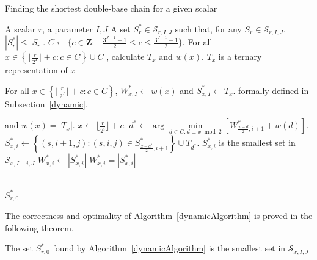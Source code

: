 \begin{algorithm}
	\caption{Finding the shortest double-base chain for a given scalar}
	\begin{algorithmic}
		\Require A scalar $r$, a parameter $I, J$
		\Ensure A set $S_r^* \in \mathcal{S}_{r,I,J}$ such that, for any $S_r \in \mathcal{S}_{r,I,J}$, $|S^*_r| \leq |S_r|$. 
		\Statex
		\State $C \leftarrow \{c \in \mathbf{Z} : -\frac{3^{J + 1} - 1}{2} \leq c \leq  \frac{3^{J + 1} - 1}{2}\}$.
		\State For all $x \in \left\{ \lfloor \frac{r}{2^I} \rfloor + c  : c \in C\right\} \cup C$ , calculate $T_x$ and $w(x)$.
		\Comment $T_x$ is a ternary representation of $x$
		 
		\State For all $x \in \left\{ \lfloor \frac{r}{2^I} \rfloor + c  : c \in C\right\}$, $W_{x,I}^* \leftarrow w(x)$ and $S_{x,I}^* \leftarrow T_x$. 
		\Comment formally defined in Subsection~\ref{dynamic},
				
		 \Comment and $w(x) = |T_x|$.
				\State $x \leftarrow \lfloor \frac{r}{2^i} \rfloor + c$.
				\State $d^* \leftarrow \arg \min\limits_{d \in C : d \equiv x \bmod 2} \left[ W^*_{\frac{x - d}{2}, i + 1 } + w(d) \right]$. 
				\State $S_{x,i}^* \leftarrow \left\{(s,i + 1,j) : (s,i,j) \in S^*_{\frac{x - d^*}{2}, i + 1 } \right\} \cup T_{d^*}$.
				\Comment $S_{x,i}^*$ is the smallest set in $\mathcal{S}_{x, I - i, J}$ 
				\State $W_{x,i}^* \leftarrow |S_{x,i}^*|$
				\Comment $W_{x,i}^* = |S_{x,i}^*|$
			\EndFor
		\EndFor
		
		\\ \Return $S_{r,0}^*$
	\end{algorithmic}
	\label{dynamicAlgorithm}
\end{algorithm}

The correctness and optimality of Algorithm~\ref{dynamicAlgorithm} is proved in the following theorem. 

\begin{theorem}
The set $S^*_{r,0}$ found by Algorithm~\ref{dynamicAlgorithm} is the smallest set in $\mathcal{S}_{x,I,J}$
\end{theorem}

